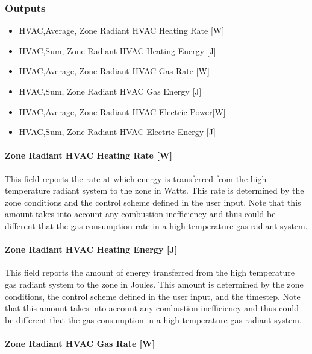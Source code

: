 \subsubsection{Outputs}\label{outputs-8-006}

\begin{itemize}
\item
  HVAC,Average, Zone Radiant HVAC Heating Rate {[}W{]}
\item
  HVAC,Sum, Zone Radiant HVAC Heating Energy {[}J{]}
\item
  HVAC,Average, Zone Radiant HVAC Gas Rate {[}W{]}
\item
  HVAC,Sum, Zone Radiant HVAC Gas Energy {[}J{]}
\item
  HVAC,Average, Zone Radiant HVAC Electric Power{[}W{]}
\item
  HVAC,Sum, Zone Radiant HVAC Electric Energy {[}J{]}
\end{itemize}

\paragraph{Zone Radiant HVAC Heating Rate {[}W{]}}\label{zone-radiant-hvac-heating-rate-w-3}

This field reports the rate at which energy is transferred from the high temperature radiant system to the zone in Watts. This rate is determined by the zone conditions and the control scheme defined in the user input. Note that this amount takes into account any combustion inefficiency and thus could be different that the gas consumption rate in a high temperature gas radiant system.

\paragraph{Zone Radiant HVAC Heating Energy {[}J{]}}\label{zone-radiant-hvac-heating-energy-j-3}

This field reports the amount of energy transferred from the high temperature gas radiant system to the zone in Joules. This amount is determined by the zone conditions, the control scheme defined in the user input, and the timestep. Note that this amount takes into account any combustion inefficiency and thus could be different that the gas consumption in a high temperature gas radiant system.

\paragraph{Zone Radiant HVAC Gas Rate {[}W{]}}\label{zone-radiant-hvac-gas-rate-w}

